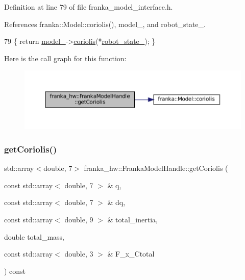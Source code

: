 Definition at line 79 of file franka\+\_\+model\+\_\+interface.\+h.



References franka\+::\+Model\+::coriolis(), model\+\_\+, and robot\+\_\+state\+\_\+.


\begin{DoxyCode}
79 \{ \textcolor{keywordflow}{return} \hyperlink{classfranka__hw_1_1FrankaModelHandle_a0c47e6c735f1bd809581b0498d53349b}{model\_}->\hyperlink{classfranka_1_1Model_a9be45a91c3288088dd222f2e55870aa8}{coriolis}(*\hyperlink{classfranka__hw_1_1FrankaModelHandle_a16192f263ce4709d99f557c6d8fabeb1}{robot\_state\_}); \}
\end{DoxyCode}
Here is the call graph for this function\+:
\nopagebreak
\begin{figure}[H]
\begin{center}
\leavevmode
\includegraphics[width=350pt]{classfranka__hw_1_1FrankaModelHandle_a8464b57e4652399c19c8abf2a426eebe_cgraph}
\end{center}
\end{figure}
\mbox{\label{classfranka__hw_1_1FrankaModelHandle_aa503a5006467f3fd48140a296362e1d1}} 
\subsubsection{\texorpdfstring{get\+Coriolis()}{getCoriolis()}\hspace{0.1cm}{\footnotesize\ttfamily [2/2]}}
{\footnotesize\ttfamily std\+::array$<$double, 7$>$ franka\+\_\+hw\+::\+Franka\+Model\+Handle\+::get\+Coriolis (\begin{DoxyParamCaption}\item[{const std\+::array$<$ double, 7 $>$ \&}]{q,  }\item[{const std\+::array$<$ double, 7 $>$ \&}]{dq,  }\item[{const std\+::array$<$ double, 9 $>$ \&}]{total\+\_\+inertia,  }\item[{double}]{total\+\_\+mass,  }\item[{const std\+::array$<$ double, 3 $>$ \&}]{F\+\_\+x\+\_\+\+Ctotal }\end{DoxyParamCaption}) const\hspace{0.3cm}{\ttfamily [inline]}}

